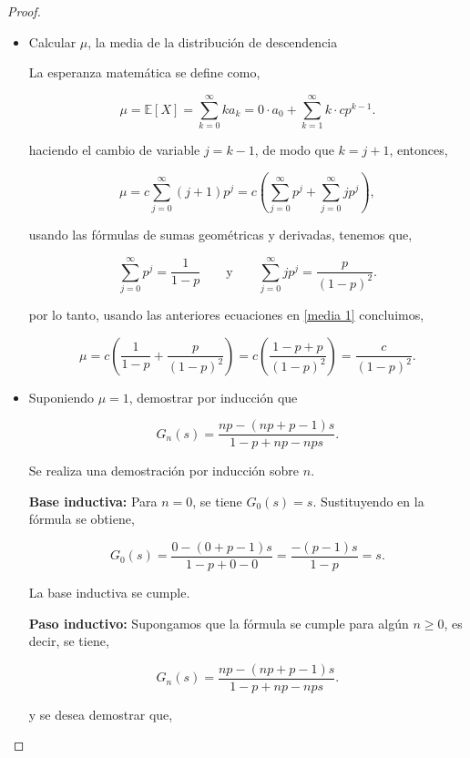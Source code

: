 \documentclass{article}
\begin{document}
\begin{proof}
\begin{itemize}
\item[(a)] Calcular \( \mu \), la media de la distribución de descendencia

La esperanza matemática se define como,

\[
\mu = \mathbb{E}[X] = \sum_{k=0}^{\infty} k a_k = 0 \cdot a_0 + \sum_{k=1}^{\infty} k \cdot c p^{k-1}.
\]

haciendo el cambio de variable \( j = k - 1 \), de modo que \( k = j + 1 \), entonces,

\begin{equation}
    \label{media 1}
    \mu = c \sum_{j=0}^{\infty} (j + 1) p^j = c \left( \sum_{j=0}^{\infty} p^j + \sum_{j=0}^{\infty} j p^j \right),
\end{equation}

usando las fórmulas de sumas geométricas y derivadas, tenemos que,

\[
\sum_{j=0}^{\infty} p^j = \frac{1}{1 - p} \qquad \text{y} \qquad \sum_{j=0}^{\infty} j p^j = \frac{p}{(1 - p)^2}.
\]

por lo tanto, usando las anteriores ecuaciones en \eqref{media 1} concluimos,

\[
\mu = c \left( \frac{1}{1 - p} + \frac{p}{(1 - p)^2} \right) = c \left( \frac{1 - p + p}{(1 - p)^2} \right) = \frac{c}{(1 - p)^2}.
\]

\end{itemize}

\begin{itemize}
\item[(b)] Suponiendo \( \mu = 1 \), demostrar por inducción que

\[
G_n(s) = \frac{n p - (n p + p - 1) s}{1 - p + n p - n p s}.
\]

Se realiza una demostración por inducción sobre \( n \).

\textbf{Base inductiva:} Para \( n = 0 \), se tiene \( G_0(s) = s \). Sustituyendo en la fórmula se obtiene,

\[
G_0(s) = \frac{0 - (0 + p - 1)s}{1 - p + 0 - 0} = \frac{-(p - 1)s}{1 - p} = s.
\]

La base inductiva se cumple.

\textbf{Paso inductivo:} Supongamos que la fórmula se cumple para algún \( n \geq 0 \), es decir, se tiene,

\[
G_n(s) = \frac{n p - (n p + p - 1) s}{1 - p + n p - n p s}.
\]

y se desea demostrar que,


\end{itemize}
\end{proof}
\end{document}
